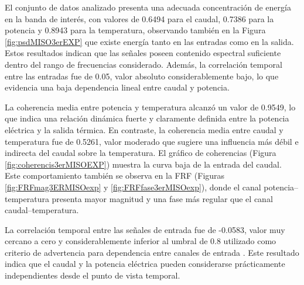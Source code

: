 \documentclass[11pt]{report}
\begin{document}
El conjunto de datos analizado presenta una adecuada concentración de energía en la banda de interés, con valores de 0.6494 para el caudal, 0.7386 para la potencia y 0.8943 para la temperatura, observando también en la Figura \ref{fig:psdMISO3erEXP} que existe energía tanto en las entradas como en la salida. Estos resultados indican que las señales poseen contenido espectral suficiente dentro del rango de frecuencias considerado. Además, la correlación temporal entre las entradas fue de 0.05, valor absoluto considerablemente bajo, lo que evidencia una baja dependencia lineal entre caudal y potencia.

La coherencia media entre potencia y temperatura alcanzó un valor de 0.9549, lo que indica una relación dinámica fuerte y claramente definida entre la potencia eléctrica y la salida térmica. En contraste, la coherencia media entre caudal y temperatura fue de 0.5261, valor moderado que sugiere una influencia más débil e indirecta del caudal sobre la temperatura. El gráfico de coherencias (Figura \ref{fig:coherencis3erMISOEXP}) muestra la curva baja de la entrada del caudal. Este comportamiento también se observa en la FRF (Figuras \ref{fig:FRFmag3ERMISOexp} y \ref{fig:FRFfase3erMISOexp}), donde el canal potencia–temperatura presenta mayor magnitud y una fase más regular que el canal caudal–temperatura.

La correlación temporal entre las señales de entrada fue de -0.0583, valor muy cercano a cero y considerablemente inferior al umbral de 0.8 utilizado como criterio de advertencia para dependencia entre canales de entrada \cite{csurcsia2020user}. Este resultado indica que el caudal y la potencia eléctrica pueden considerarse prácticamente independientes desde el punto de vista temporal.
\end{document}
